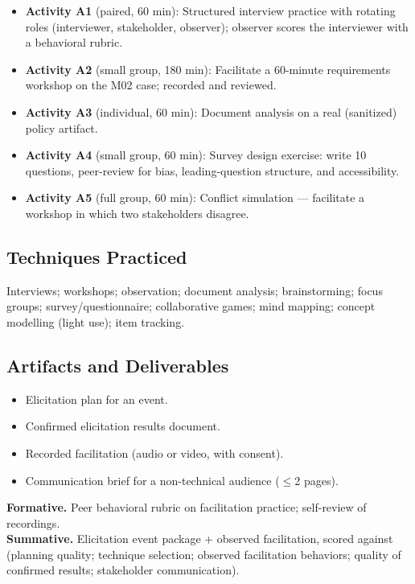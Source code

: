 \documentclass[11pt,letterpaper,oneside]{report}
\begin{document}
\begin{labbox}
\begin{itemize}
  \item \textbf{Activity A1} (paired, 60 min): Structured interview practice with rotating roles (interviewer, stakeholder, observer); observer scores the interviewer with a behavioral rubric.
  \item \textbf{Activity A2} (small group, 180 min): Facilitate a 60-minute requirements workshop on the M02 case; recorded and reviewed.
  \item \textbf{Activity A3} (individual, 60 min): Document analysis on a real (sanitized) policy artifact.
  \item \textbf{Activity A4} (small group, 60 min): Survey design exercise: write 10 questions, peer-review for bias, leading-question structure, and accessibility.
  \item \textbf{Activity A5} (full group, 60 min): Conflict simulation --- facilitate a workshop in which two stakeholders disagree.
\end{itemize}
\end{labbox}

\subsection*{Techniques Practiced}
Interviews; workshops; observation; document analysis; brainstorming; focus groups; survey/questionnaire; collaborative games; mind mapping; concept modelling (light use); item tracking.

\subsection*{Artifacts and Deliverables}
\begin{itemize}
  \item Elicitation plan for an event.
  \item Confirmed elicitation results document.
  \item Recorded facilitation (audio or video, with consent).
  \item Communication brief for a non-technical audience ($\leq$2 pages).
\end{itemize}

\begin{curriculumassessment}
\textbf{Formative.} Peer behavioral rubric on facilitation practice; self-review of recordings.\\[3pt]
\textbf{Summative.} Elicitation event package + observed facilitation, scored against  (planning quality; technique selection; observed facilitation behaviors; quality of confirmed results; stakeholder communication).
\end{curriculumassessment}
\end{document}
